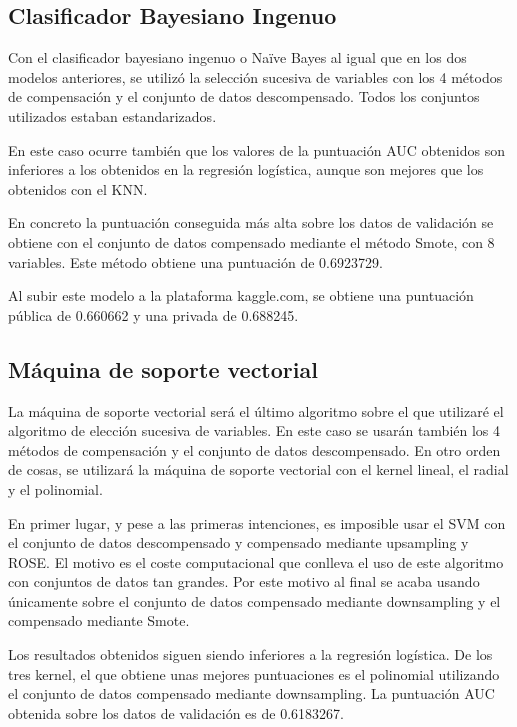 \documentclass[11pt,a4paper,spanish]{article} %
\begin{document}
\subsection{Clasificador Bayesiano Ingenuo}
Con el clasificador bayesiano ingenuo o Naïve Bayes al igual que en los dos modelos anteriores, se utilizó la selección sucesiva de variables con los 4 métodos de compensación y el conjunto de datos descompensado. Todos los conjuntos utilizados estaban estandarizados. 

En este caso ocurre también que los valores de la puntuación AUC obtenidos son inferiores a los obtenidos en la regresión logística, aunque son mejores que los obtenidos con el KNN. 

En concreto la puntuación conseguida más alta sobre los datos de validación se obtiene con el conjunto de datos compensado mediante el método Smote, con 8 variables. Este método obtiene una puntuación de 0.6923729. 

Al subir este modelo a la plataforma kaggle.com, se obtiene una puntuación pública de 0.660662 y una privada de 0.688245. 

\vspace{0.5cm}

\subsection{Máquina de soporte vectorial}
La máquina de soporte vectorial será el último algoritmo sobre el que utilizaré el algoritmo de elección sucesiva de variables. En este caso se usarán también los 4 métodos de compensación y el conjunto de datos descompensado. En otro orden de cosas, se utilizará la máquina de soporte vectorial con el kernel lineal, el radial y el polinomial. 

En primer lugar, y pese a las primeras intenciones, es imposible usar el SVM con el conjunto de datos descompensado y compensado mediante upsampling y ROSE. El motivo es el coste computacional que conlleva el uso de este algoritmo con conjuntos de datos tan grandes. Por este motivo al final se acaba usando únicamente sobre el conjunto de datos compensado mediante downsampling y el compensado mediante Smote. 

Los resultados obtenidos siguen siendo inferiores a la regresión logística. De los tres kernel, el que obtiene unas mejores puntuaciones es el polinomial utilizando el conjunto de datos compensado mediante downsampling. La puntuación AUC obtenida sobre los datos de validación es de 0.6183267. 
\end{document}
